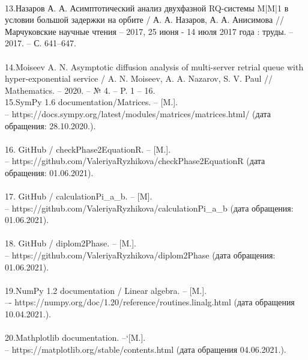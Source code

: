 \\
13.Назаров А. А. Асимптотический анализ двухфазной RQ-системы M|M|1 в условии большой задержки на орбите / А. А. Назаров, А. А. Анисимова // Марчуковские научные чтения – 2017, 25 июня - 14 июля 2017 года : труды. -- 2017. -- С. 641--647.\\
\\
14.Moiseev A. N. Asymptotic diffusion analysis of multi-server retrial queue with hyper-exponential service / A. N. Moiseev, A. A. Nazarov, S. V. Paul // Mathematics. -- 2020. -- № 4. -- P. 1 -- 16.\
\\
15.SymPy 1.6 documentation/Matrices. -- [M.].\\ -- https://docs.sympy.org/latest/modules/matrices/matrices.html/  (дата обращения: 28.10.2020.).\\
\\
16. GitHub / checkPhase2EquationR. -- [M.].\\ --  https://github.com/ValeriyaRyzhikova/checkPhase2EquationR (дата обращения: 01.06.2021).\\
\\
17. GitHub / calculationPi\_a\_b. -- [M].\\ -- https://github.com/ValeriyaRyzhikova/calculationPi\_a\_b (дата обращения: 01.06.2021).\\
\\
18. GitHub / diplom2Phase. -- [M.].\\ -- https://github.com/ValeriyaRyzhikova/diplom2Phase (дата обращения: 01.06.2021).\\
\\
19.NumPy 1.2 documentation / Linear algebra. -- [M.].\\ –- https://numpy.org/doc/1.20/reference/routines.linalg.html  (дата обращения 10.04.2021.).\\
\\
20.Mathplotlib documentation. --`[M.].\\ -- https://matplotlib.org/stable/contents.html  (дата обращения 04.06.2021.).\\